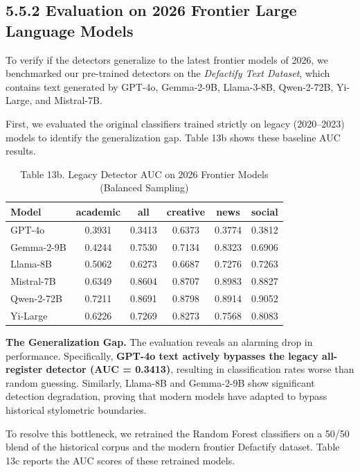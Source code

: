 \documentclass{article}
\begin{document}
\subsection{5.5.2 Evaluation on 2026 Frontier Large Language Models}

To verify if the detectors generalize to the latest frontier models of 2026, we benchmarked our pre-trained detectors on the \textit{Defactify Text Dataset}, which contains text generated by GPT-4o, Gemma-2-9B, Llama-3-8B, Qwen-2-72B, Yi-Large, and Mistral-7B.

First, we evaluated the original classifiers trained strictly on legacy (2020--2023) models to identify the generalization gap. Table 13b shows these baseline AUC results.


\begin{table}[H]
\centering
\small
\begin{tabular}{lccccc}
\toprule
\textbf{Model} & \textbf{academic} & \textbf{all} & \textbf{creative} & \textbf{news} & \textbf{social} \\
\midrule
GPT-4o & 0.3931 & 0.3413 & 0.6373 & 0.3774 & 0.3812 \\
Gemma-2-9B & 0.4244 & 0.7530 & 0.7134 & 0.8323 & 0.6906 \\
Llama-8B & 0.5062 & 0.6273 & 0.6687 & 0.7276 & 0.7263 \\
Mistral-7B & 0.6349 & 0.8604 & 0.8707 & 0.8983 & 0.8827 \\
Qwen-2-72B & 0.7211 & 0.8691 & 0.8798 & 0.8914 & 0.9052 \\
Yi-Large & 0.6226 & 0.7269 & 0.8273 & 0.7568 & 0.8083 \\
\bottomrule
\end{tabular}
\caption{Table 13b. Legacy Detector AUC on 2026 Frontier Models (Balanced Sampling)}
\end{table}

\textbf{The Generalization Gap.} The evaluation reveals an alarming drop in performance. Specifically, \textbf{GPT-4o text actively bypasses the legacy all-register detector (AUC = 0.3413)}, resulting in classification rates worse than random guessing. Similarly, Llama-8B and Gemma-2-9B show significant detection degradation, proving that modern models have adapted to bypass historical stylometric boundaries.

To resolve this bottleneck, we retrained the Random Forest classifiers on a 50/50 blend of the historical corpus and the modern frontier Defactify dataset. Table 13c reports the AUC scores of these retrained models.
\end{document}
